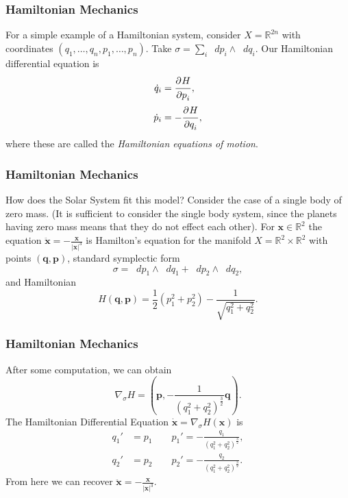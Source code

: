 \documentclass{beamer}
\newcommand{\R}{\mathbb{R}}
\newcommand{\bp}[1]{\bm{#1}}
\newcommand{\bd}[1]{\bm{\dot{#1}}}
\newcommand{\bdd}[1]{\bm{\ddot{#1}}}
\newcommand{\sgrad}{\nabla_{\sigma}}
\newcommand{\dif}{\mathop{}\!{d}}
\newcommand\pd[3][]{\frac{\strut\partial^{#1}#2}{\strut\partial#3^{#1}}}
\begin{document}
\begin{frame}
  \frametitle{Hamiltonian Mechanics}
  For a simple example of a Hamiltonian system, consider $X = \R^{2n}$
  with coordinates $(q_1, \ldots, q_n, p_1, \ldots, p_n)$.
  Take $\sigma = \sum_i \dif p_i \wedge \dif q_i$.
  Our Hamiltonian differential equation is
  \begin{align*}
    \dot{q}_i &= \pd{H}{p_i},\\
    \dot{p}_i &= -\pd{H}{q_i},
  \end{align*}
  where these are called the \emph{Hamiltonian equations of motion}.
\end{frame}


\begin{frame}
  \frametitle{Hamiltonian Mechanics}
  How does the Solar System fit this model?
  Consider the case of a single body of zero mass.
  (It is sufficient to consider the single body system, since the planets having
  zero mass means that they do not effect each other).
  For $\bp{x} \in \R^2$ the equation $\bdd{x} = -\frac{\bp{x}}{|\bp{x}|^3}$ is
  Hamilton's equation for the manifold $X = \R^2 \times \R^2$ with points
  $(\bp{q}, \bp{p})$, standard symplectic form
  \begin{equation*}
    \sigma = \dif p_1 \wedge \dif q_1 + \dif p_2 \wedge \dif q_2,
  \end{equation*}
  and Hamiltonian
  \begin{equation*}
    H(\bp{q}, \bp{p}) = \frac{1}{2} (p_1^2 + p_2^2) - \frac{1}{\sqrt{q_1^2 +
    q_2^2}}.
  \end{equation*}
\end{frame}

\begin{frame}
  \frametitle{Hamiltonian Mechanics}
  After some computation, we can obtain
  \begin{equation*}
    \sgrad H = \left( \bp{p}, -\frac{1}{(q_1^2 + q_2^2)^{\frac{3}{2}}} \bp{q}
    \right).
  \end{equation*}
  The Hamiltonian Differential Equation $\bd{x} = \sgrad H(\bp{x})$ is
  \begin{align*}
    q_1' &= p_1 \qquad p_1' = - \frac{q_1}{(q_1^2 + q_2^2)^{\frac{3}{2}}},\\
    q_2' &= p_2 \qquad p_2' = - \frac{q_2}{(q_1^2 + q_2^2)^{\frac{3}{2}}}.
  \end{align*}
  From here we can recover $\bdd{x} = -\frac{\bp{x}}{|\bp{x}|^3}$.
\end{frame}
\end{document}
